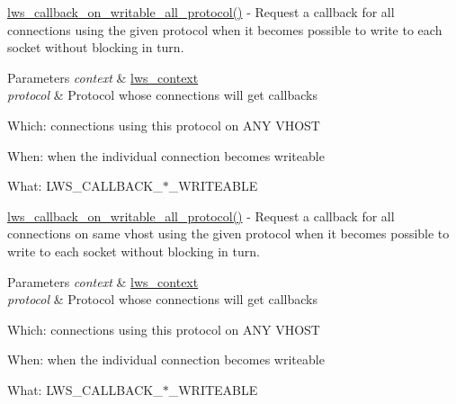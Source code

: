 \hyperlink{group__callback-when-writeable_gabbe4655c7eeb3eb1671b2323ec6b3107}{lws\+\_\+callback\+\_\+on\+\_\+writable\+\_\+all\+\_\+protocol()} -\/ Request a callback for all connections using the given protocol when it becomes possible to write to each socket without blocking in turn.


\begin{DoxyParams}{Parameters}
{\em context} & \hyperlink{structlws__context}{lws\+\_\+context} \\
\hline
{\em protocol} & Protocol whose connections will get callbacks\\
\hline
\end{DoxyParams}

\begin{DoxyItemize}
\item Which\+: connections using this protocol on A\+NY V\+H\+O\+ST
\item When\+: when the individual connection becomes writeable
\item What\+: L\+W\+S\+\_\+\+C\+A\+L\+L\+B\+A\+C\+K\+\_\+$\ast$\+\_\+\+W\+R\+I\+T\+E\+A\+B\+LE
\end{DoxyItemize}

\hyperlink{group__callback-when-writeable_gabbe4655c7eeb3eb1671b2323ec6b3107}{lws\+\_\+callback\+\_\+on\+\_\+writable\+\_\+all\+\_\+protocol()} -\/ Request a callback for all connections on same vhost using the given protocol when it becomes possible to write to each socket without blocking in turn.


\begin{DoxyParams}{Parameters}
{\em context} & \hyperlink{structlws__context}{lws\+\_\+context} \\
\hline
{\em protocol} & Protocol whose connections will get callbacks\\
\hline
\end{DoxyParams}

\begin{DoxyItemize}
\item Which\+: connections using this protocol on A\+NY V\+H\+O\+ST
\item When\+: when the individual connection becomes writeable
\item What\+: L\+W\+S\+\_\+\+C\+A\+L\+L\+B\+A\+C\+K\+\_\+$\ast$\+\_\+\+W\+R\+I\+T\+E\+A\+B\+LE 
\end{DoxyItemize}\mbox{\label{group__callback-when-writeable_ga8570860e191b62db264f2bac67354ea8}} 
